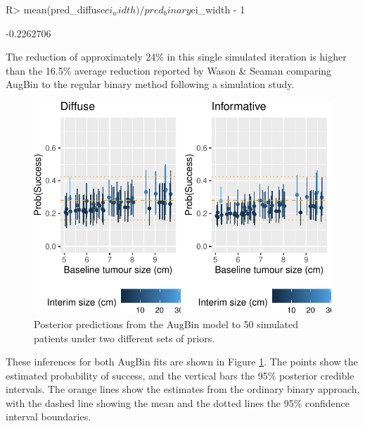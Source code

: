 \documentclass[article]{jss}
\begin{document}
\begin{CodeChunk}

\begin{CodeInput}
R> mean(pred_diffuse$ci_width) / pred_binary$ci_width - 1
\end{CodeInput}

\begin{CodeOutput}
[1] -0.2262706
\end{CodeOutput}
\end{CodeChunk}

The reduction of approximately 24\% in this single simulated iteration
is higher than the 16.5\% average reduction reported by Wason \& Seaman
comparing AugBin to the regular binary method following a simulation
study.

\begin{CodeChunk}
\begin{figure}

{\centering \includegraphics{trialr_files/figure-latex/post_pred_augbin-1} 

}

\caption[Posterior predictions from the AugBin model to 50 simulated patients under two different sets of priors]{Posterior predictions from the AugBin model to 50 simulated patients under two different sets of priors.}\label{fig:post_pred_augbin}
\end{figure}
\end{CodeChunk}

These inferences for both AugBin fits are shown in Figure
\ref{fig:post_pred_augbin}. The points show the estimated probability of
success, and the vertical bars the 95\% posterior credible intervals.
The orange lines show the estimates from the ordinary binary approach,
with the dashed line showing the mean and the dotted lines the 95\%
confidence interval boundaries.
\end{document}
